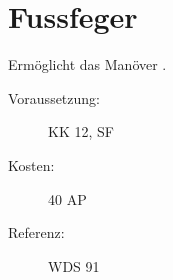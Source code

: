 \section{Fussfeger}
\label{sf.fussfeger}
Ermöglicht das Manöver .
\begin{description}
    \item[Voraussetzung:]
        KK 12, SF 
    \item [Kosten:]
        40 AP
    \item [Referenz:]
        WDS 91
\end{description}
